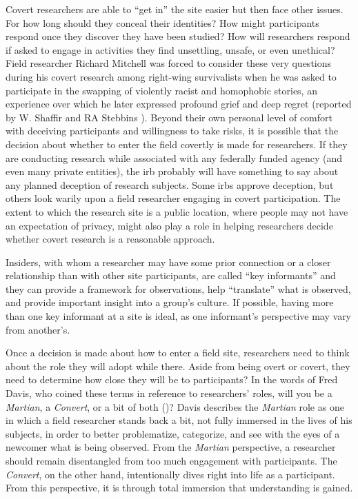Covert researchers are able to ``get in'' the site easier but then face other issues. For how long should they conceal their identities? How might participants respond once they discover they have been studied? How will researchers respond if asked to engage in activities they find unsettling, unsafe, or even unethical? Field researcher Richard Mitchell was forced to consider these very questions during his covert research among right-wing survivalists when he was asked to participate in the swapping of violently racist and homophobic stories, an experience over which he later expressed profound grief and deep regret (reported by W. Shaffir and RA Stebbins \cite{fieldwork1991inside}). Beyond their own personal level of comfort with deceiving participants and willingness to take risks, it is possible that the decision about whether to enter the field covertly is made for researchers. If they are conducting research while associated with any federally funded agency (and even many private entities), the \gls{irb} probably will have something to say about any planned deception of research subjects. Some \glspl{irb} approve deception, but others look warily upon a field researcher engaging in covert participation. The extent to which the research site is a public location, where people may not have an expectation of privacy, might also play a role in helping researchers decide whether covert research is a reasonable approach.

Insiders, with whom a researcher may have some prior connection or a closer relationship than with other site participants, are called ``key informants'' and they can provide a framework for observations, help ``translate'' what is observed, and provide important insight into a group's culture. If possible, having more than one key informant at a site is ideal, as one informant's perspective may vary from another's.

Once a decision is made about how to enter a field site, researchers need to think about the role they will adopt while there. Aside from being overt or covert, they need to determine how close they will be to participants? In the words of Fred Davis, who coined these terms in reference to researchers' roles, will you be a \textit{Martian}, a \textit{Convert}, or a bit of both (\cite{davis1973martian})? Davis describes the \textit{Martian} role as one in which a field researcher stands back a bit, not fully immersed in the lives of his subjects, in order to better problematize, categorize, and see with the eyes of a newcomer what is being observed. From the \textit{Martian} perspective, a researcher should remain disentangled from too much engagement with participants. The \textit{Convert}, on the other hand, intentionally dives right into life as a participant. From this perspective, it is through total immersion that understanding is gained.

